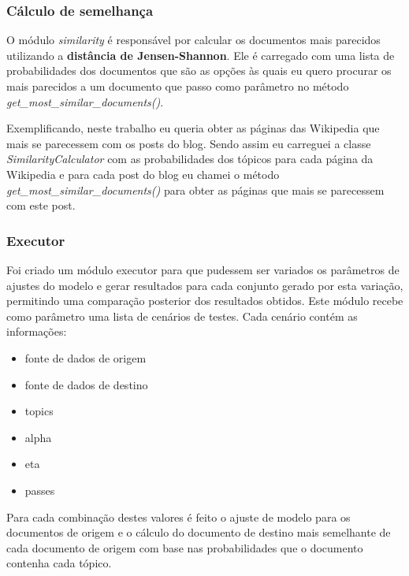 \subsubsection{Cálculo de semelhança}

O módulo \textit{similarity} é responsável por calcular os documentos mais parecidos utilizando a \textbf{distância de Jensen-Shannon}.
Ele é carregado com uma lista de probabilidades dos documentos que são as opções às quais eu quero procurar os mais parecidos a um documento que passo 
como parâmetro no método \textit{get\_most\_similar\_documents()}.

Exemplificando, neste trabalho eu queria obter as páginas das Wikipedia que mais se parecessem com os posts do blog. Sendo assim eu carreguei a classe
\textit{SimilarityCalculator} com as probabilidades dos tópicos para cada página da Wikipedia e para cada post do blog eu chamei o método 
\textit{get\_most\_similar\_documents()} para obter as páginas que mais se parecessem com este post.

\vspace{3mm} %


\subsubsection{Executor}

Foi criado um módulo executor para que pudessem ser variados os parâmetros de ajustes do modelo e gerar resultados para cada conjunto gerado por esta variação, permitindo uma comparação posterior dos resultados obtidos.
Este módulo recebe como parâmetro uma lista de cenários de testes. Cada cenário contém as informações:
\begin{itemize}
    \item fonte de dados de origem
    \item fonte de dados de destino
    \item topics
    \item alpha
    \item eta
    \item passes
\end{itemize}

Para cada combinação destes valores é feito o ajuste de modelo para os documentos de origem e o cálculo do documento de destino mais semelhante de 
cada documento de origem com base nas probabilidades que o documento contenha cada tópico.

